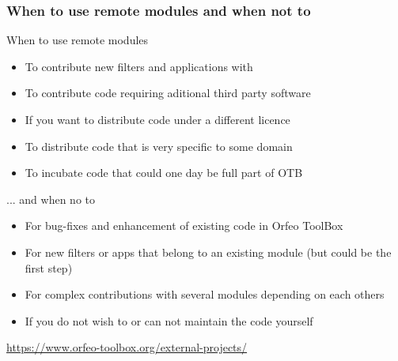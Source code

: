 \documentclass[8pt]{beamer}
\begin{document}
\begin{frame}
\frametitle{When to use remote modules and when not to}

\begin{block}{When to use remote modules}
\begin{itemize}
\item To contribute new filters and applications with
\item To contribute code requiring aditional third party software
\item If you want to distribute code under a different licence
\item To distribute code that is very specific to some domain
\item To incubate code that could one day be full part of OTB
\end{itemize}
\end{block}

\begin{block}{... and when no to}
\begin{itemize}
\item For bug-fixes and enhancement of existing code in Orfeo ToolBox
\item For new filters or apps that belong to an existing module (but could be the first step)
\item For complex contributions with several modules depending on each others
\item If you do not wish to or can not maintain the code yourself
\end{itemize}
\end{block}

\begin{center}
\url{https://www.orfeo-toolbox.org/external-projects/}
\end{center}

\end{frame}
\end{document}
